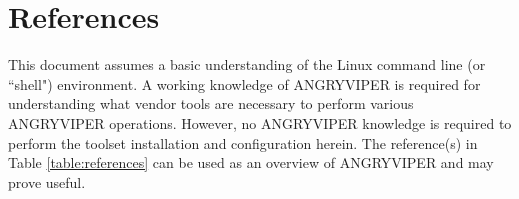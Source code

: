\newpage

\tableofcontents

\newpage

\section{References}

	This document assumes a basic understanding of the Linux command line (or ``shell") environment. A working knowledge of ANGRYVIPER is required for understanding what vendor tools are necessary to perform various ANGRYVIPER operations. However, no ANGRYVIPER knowledge is required to perform the toolset installation and configuration herein. The reference(s) in Table \ref{table:references} can be used as an overview of ANGRYVIPER and may prove useful.
\def\refcapbottom{}


